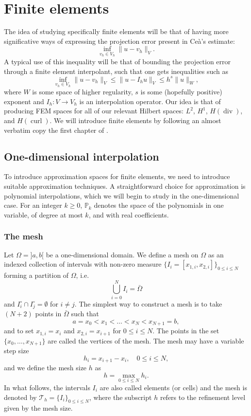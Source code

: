 \documentclass{article}
\DeclareMathOperator{\dive}{\text{div}}
\DeclareMathOperator{\curl}{\text{curl}}
\begin{document}
\section{Finite elements}\label{sec:fem}
The idea of studying specifically finite elements will be that of having more significative ways of expressing the projection error present in Ceà's estimate: 
    $$ \inf_{v_h\in V_h} \| u - v_h\|_V. $$
A typical use of this inequality will be that of bounding the projection error through a finite element interpolant, such that one gets inequalities such as
    $$ \inf_{v_h\in V_h} \| u - v_h\|_V \leq \| u - I_h u \|_V \leq h^s \|u \|_W, $$
where $W$ is some space of higher regularity, $s$ is some (hopefully positive) exponent and $I_h:V \to V_h$ is an interpolation operator. Our idea is that of producing FEM spaces for all of our relevant Hilbert spaces: $L^2$, $H^1$, $H(\dive)$, and $H(\curl)$. We will introduce finite elements by following an almost verbatim copy the first chapter of \cite{ern2004theory}. 

\subsection{One-dimensional interpolation} 

To introduce approximation spaces for finite elements, we need to introduce suitable approximation techniques. A straightforward choice for approximation is polynomial interpolations, which we will begin to study in the one-dimensional case. For an integer $k \ge 0$, $\mathbb{P}_k$ denotes the space of the polynomials in one variable, of degree at most $k$, and with real coefficients.

\subsubsection{The mesh}
Let $\Omega = ]a, b[$ be a one-dimensional domain. We define a mesh on $\Omega$ as an indexed collection of intervals with non-zero measure $\{I_i = [x_{1,i}, x_{2,i}]\}_{0 \leq i \leq N}$ forming a partition of $\Omega$, i.e.
$$ \bigcup_{i=0}^N I_i = \bar{\Omega} $$
and $I_i^\circ \cap I_j^\circ = \emptyset$ for $i \neq j$.
The simplest way to construct a mesh is to take $(N+2)$ points in $\bar{\Omega}$ such that
$$ a = x_0 < x_1 < \dots < x_N < x_{N+1} = b, $$
and to set $x_{1,i} = x_i$ and $x_{2,i} = x_{i+1}$ for $0 \le i \le N$. The points in the set $\{x_0, \dots, x_{N+1}\}$ are called the vertices of the mesh. The mesh may have a variable step size
$$ h_i = x_{i+1} - x_i, \quad 0 \leq i \le N, $$
and we define the mesh size $h$ as
$$ h = \max_{0 \le i \le N} h_i.$$
In what follows, the intervals $I_i$ are also called elements (or cells) and the mesh is denoted by $\mathcal{T}_h = \{I_i\}_{0 \le i \le N}$, where the subscript $h$ refers to the refinement level given by the mesh size.
\end{document}
